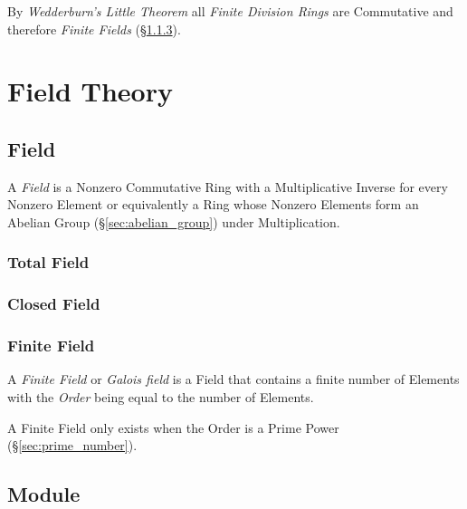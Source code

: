 By \emph{Wedderburn's Little Theorem} all \emph{Finite Division Rings}
are Commutative and therefore \emph{Finite Fields}
(\S\ref{sec:finite_field}).



\section{Field Theory}\label{sec:field_theory}

\subsection{Field}\label{sec:field}

A \emph{Field} is a Nonzero Commutative Ring with a Multiplicative
Inverse for every Nonzero Element or equivalently a Ring whose Nonzero
Elements form an Abelian Group (\S\ref{sec:abelian_group}) under
Multiplication.



\subsubsection{Total Field}\label{sec:total_field}

\subsubsection{Closed Field}\label{sec:closed_field}

\subsubsection{Finite Field}\label{sec:finite_field}

A \emph{Finite Field} or \emph{Galois field} is a Field that contains
a finite number of Elements with the \emph{Order} being equal to the
number of Elements.

A Finite Field only exists when the Order is a Prime Power
(\S\ref{sec:prime_number}).



\subsection{Module}

